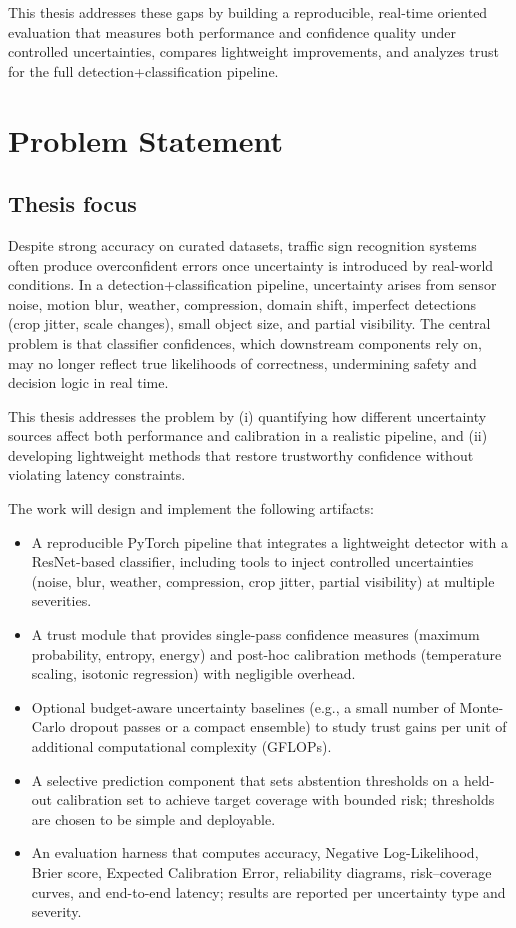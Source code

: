 \documentclass[11pt,a4paper]{article}
\begin{document}
This thesis addresses these gaps by building a reproducible, real-time oriented evaluation that measures both performance and confidence quality under controlled uncertainties, compares lightweight improvements, and analyzes trust for the full detection+classification pipeline.

\section{Problem Statement}

\subsection{Thesis focus}

Despite strong accuracy on curated datasets, traffic sign recognition systems often produce overconfident errors once uncertainty is introduced by real-world conditions. In a detection+classification pipeline, uncertainty arises from sensor noise, motion blur, weather, compression, domain shift, imperfect detections (crop jitter, scale changes), small object size, and partial visibility. The central problem is that classifier confidences, which downstream components rely on, may no longer reflect true likelihoods of correctness, undermining safety and decision logic in real time.

This thesis addresses the problem by (i) quantifying how different uncertainty sources affect both performance and calibration in a realistic pipeline, and (ii) developing lightweight methods that restore trustworthy confidence without violating latency constraints.

The work will design and implement the following artifacts:
\begin{itemize}
  \item A reproducible PyTorch pipeline that integrates a lightweight detector with a ResNet-based classifier, including tools to inject controlled uncertainties (noise, blur, weather, compression, crop jitter, partial visibility) at multiple severities.
  \item A trust module that provides single-pass confidence measures (maximum probability, entropy, energy) and post-hoc calibration methods (temperature scaling, isotonic regression) with negligible overhead.
  \item Optional budget-aware uncertainty baselines (e.g., a small number of Monte-Carlo dropout passes or a compact ensemble) to study trust gains per unit of additional computational complexity (GFLOPs).
  \item A selective prediction component that sets abstention thresholds on a held-out calibration set to achieve target coverage with bounded risk; thresholds are chosen to be simple and deployable.
  \item An evaluation harness that computes accuracy, Negative Log-Likelihood, Brier score, Expected Calibration Error, reliability diagrams, risk–coverage curves, and end-to-end latency; results are reported per uncertainty type and severity.
\end{itemize}
\end{document}
